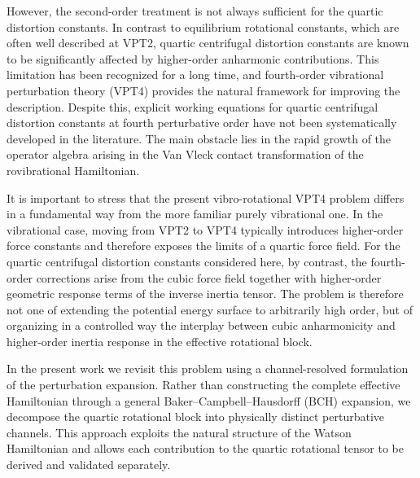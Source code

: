 \documentclass[aip,jcp,reprint]{revtex4-2}
\begin{document}
However, the second-order treatment is not always sufficient for the
quartic distortion constants.
In contrast to equilibrium rotational constants, which are often well
described at VPT2, quartic centrifugal distortion constants are known to
be significantly affected by higher-order anharmonic contributions.
This limitation has been recognized for a long time, and fourth-order
vibrational perturbation theory (VPT4) provides the natural framework
for improving the description.
Despite this, explicit working equations for quartic centrifugal
distortion constants at fourth perturbative order have not been
systematically developed in the literature.
The main obstacle lies in the rapid growth of the operator algebra
arising in the Van Vleck contact transformation of the rovibrational
Hamiltonian.\cite{VanVleck1932,Watson1968JCP}

It is important to stress that the present vibro-rotational VPT4 problem
differs in a fundamental way from the more familiar purely vibrational one.
In the vibrational case, moving from VPT2 to VPT4 typically introduces
higher-order force constants and therefore exposes the limits of a quartic
force field. For the quartic centrifugal distortion constants considered
here, by contrast, the fourth-order corrections arise from the cubic force
field together with higher-order geometric response terms of the inverse
inertia tensor. The problem is therefore not one of extending the potential
energy surface to arbitrarily high order, but of organizing in a controlled
way the interplay between cubic anharmonicity and higher-order inertia
response in the effective rotational block.

In the present work we revisit this problem using a channel-resolved
formulation of the perturbation expansion.
Rather than constructing the complete effective Hamiltonian through a
general Baker--Campbell--Hausdorff (BCH) expansion, we decompose the
quartic rotational block into physically distinct perturbative channels.
This approach exploits the natural structure of the Watson Hamiltonian
and allows each contribution to the quartic rotational tensor to be
derived and validated separately.\cite{Watson1967,Watson1968JCP}
\end{document}
